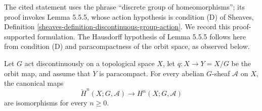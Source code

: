 \begin{lemma}
\label{lemma-equivariant-cech-comparison-discontinuous}
\begin{reference}
\cite[Chapter V, \S 5.5, Theorem 5.5.6, p. 213]{Tohoku}
\end{reference}
\begin{history}
The cited statement uses the phrase ``discrete group of homeomorphisms'';
its proof invokes Lemma 5.5.5, whose action hypothesis is condition (D) of
Sheaves, Definition \ref{sheaves-definition-discontinuous-group-action}.
We record this proof-supported formulation. The Hausdorff hypothesis of
Lemma 5.5.5 follows here from condition (D) and paracompactness of the
orbit space, as observed below.
\end{history}
Let $G$ act discontinuously on a topological space $X$, let
$q:X\to Y=X/G$ be the orbit map, and assume that $Y$ is paracompact. For
every abelian $G$-sheaf $\mathcal A$ on $X$, the canonical maps
\begin{equation}
\label{equation-equivariant-cech-comparison-discontinuous}
\check H^n(X;G,\mathcal A)
\longrightarrow H^n(X;G,\mathcal A)
\end{equation}
are isomorphisms for every $n\geq 0$.
\end{lemma}

